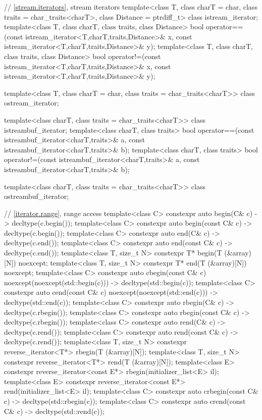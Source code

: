 \begin{codeblock}
{  // \ref{stream.iterators}, stream iterators
  template<class T, class charT = char, class traits = char_traits<charT>,
           class Distance = ptrdiff_t>
  class istream_iterator;
  template<class T, class charT, class traits, class Distance>
    bool operator==(const istream_iterator<T,charT,traits,Distance>& x,
            const istream_iterator<T,charT,traits,Distance>& y);
  template<class T, class charT, class traits, class Distance>
    bool operator!=(const istream_iterator<T,charT,traits,Distance>& x,
            const istream_iterator<T,charT,traits,Distance>& y);

  template<class T, class charT = char, class traits = char_traits<charT>>
      class ostream_iterator;

  template<class charT, class traits = char_traits<charT>>
    class istreambuf_iterator;
  template<class charT, class traits>
    bool operator==(const istreambuf_iterator<charT,traits>& a,
            const istreambuf_iterator<charT,traits>& b);
  template<class charT, class traits>
    bool operator!=(const istreambuf_iterator<charT,traits>& a,
            const istreambuf_iterator<charT,traits>& b);

  template<class charT, class traits = char_traits<charT>>
    class ostreambuf_iterator;

  // \ref{iterator.range}, range access
  template<class C> constexpr auto begin(C& c) -> decltype(c.begin());
  template<class C> constexpr auto begin(const C& c) -> decltype(c.begin());
  template<class C> constexpr auto end(C& c) -> decltype(c.end());
  template<class C> constexpr auto end(const C& c) -> decltype(c.end());
  template<class T, size_t N> constexpr T* begin(T (&array)[N]) noexcept;
  template<class T, size_t N> constexpr T* end(T (&array)[N]) noexcept;
  template<class C> constexpr auto cbegin(const C& c) noexcept(noexcept(std::begin(c)))
    -> decltype(std::begin(c));
  template<class C> constexpr auto cend(const C& c) noexcept(noexcept(std::end(c)))
    -> decltype(std::end(c));
  template<class C> constexpr auto rbegin(C& c) -> decltype(c.rbegin());
  template<class C> constexpr auto rbegin(const C& c) -> decltype(c.rbegin());
  template<class C> constexpr auto rend(C& c) -> decltype(c.rend());
  template<class C> constexpr auto rend(const C& c) -> decltype(c.rend());
  template<class T, size_t N> constexpr reverse_iterator<T*> rbegin(T (&array)[N]);
  template<class T, size_t N> constexpr reverse_iterator<T*> rend(T (&array)[N]);
  template<class E> constexpr reverse_iterator<const E*> rbegin(initializer_list<E> il);
  template<class E> constexpr reverse_iterator<const E*> rend(initializer_list<E> il);
  template<class C> constexpr auto crbegin(const C& c) -> decltype(std::rbegin(c));
  template<class C> constexpr auto crend(const C& c) -> decltype(std::rend(c));

}
\end{codeblock}

